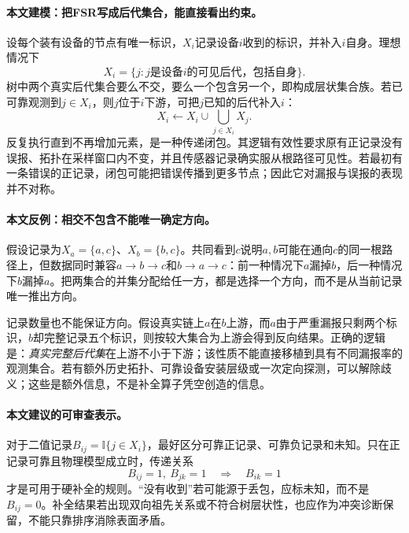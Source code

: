 \documentclass[UTF8,11pt,fontset=fandol]{ctexart}
\theoremstyle{remark}
\numberwithin{equation}{section}
\begin{document}
\paragraph{本文建模：把FSR写成后代集合，能直接看出约束。}
设每个装有设备的节点有唯一标识，$X_i$记录设备$i$收到的标识，并补入$i$自身。理想情况下
\begin{equation}
 X_i=\{j:j\text{是设备}i\text{的可见后代，包括自身}\}.
 \label{eq:p4-descendant-set}
\end{equation}
树中两个真实后代集合要么不交，要么一个包含另一个，即构成层状集合族。若已可靠观测到$j\in X_i$，则$j$位于$i$下游，可把$j$已知的后代补入$i$：
\begin{equation}
 X_i\leftarrow X_i\cup\!\bigcup_{j\in X_i}X_j.
 \label{eq:p4-closure}
\end{equation}
反复执行直到不再增加元素，是一种传递闭包。其逻辑有效性要求原有正记录没有误报、拓扑在采样窗口内不变，并且传感器记录确实服从根路径可见性。若最初有一条错误的正记录，闭包可能把错误传播到更多节点；因此它对漏报与误报的表现并不对称。

\paragraph{本文反例：相交不包含不能唯一确定方向。}
假设记录为$X_a=\{a,c\}$、$X_b=\{b,c\}$。共同看到$c$说明$a,b$可能在通向$c$的同一根路径上，但数据同时兼容$a\to b\to c$和$b\to a\to c$：前一种情况下$a$漏掉$b$，后一种情况下$b$漏掉$a$。把两集合的并集分配给任一方，都是选择一个方向，而不是从当前记录唯一推出方向。

记录数量也不能保证方向。假设真实链上$a$在$b$上游，而$a$由于严重漏报只剩两个标识，$b$却完整记录五个标识，则按较大集合为上游会得到反向结果。正确的逻辑是：\emph{真实完整后代集}在上游不小于下游；该性质不能直接移植到具有不同漏报率的观测集合。若有额外历史拓扑、可靠设备安装层级或一次定向探测，可以解除歧义；这些是额外信息，不是补全算子凭空创造的信息。

\paragraph{本文建议的可审查表示。}
对于二值记录$B_{ij}=\mathbb I\{j\in X_i\}$，最好区分可靠正记录、可靠负记录和未知。只在正记录可靠且物理模型成立时，传递关系
\begin{equation}
 B_{ij}=1,\ B_{jk}=1\quad\Longrightarrow\quad B_{ik}=1
 \label{eq:p4-transitivity}
\end{equation}
才是可用于硬补全的规则。“没有收到”若可能源于丢包，应标未知，而不是$B_{ij}=0$。补全结果若出现双向祖先关系或不符合树层状性，也应作为冲突诊断保留，不能只靠排序消除表面矛盾。
\end{document}
